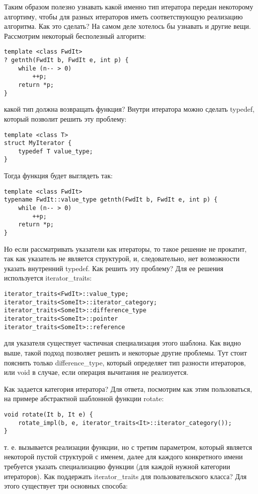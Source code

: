 Таким образом полезно узнавать какой именно тип итератора передан некоторому алгортиму, чтобы для разных итераторов иметь соответствующую реализацию алгоритма.
Как это сделать? На самом деле хотелось бы узнавать и другие вещи. Рассмотрим некоторый бесполезный алгоритм:
\begin{lstlisting}
template <class FwdIt>
? getnth(FwdIt b, FwdIt e, int p) {
	while (n-- > 0)
		++p;
	return *p;
}
\end{lstlisting}
какой тип должна возвращать функция? Внутри итератора можно сделать typedef, который позволит решить эту проблему:
\begin{lstlisting}
template <class T>
struct MyIterator {
	typedef T value_type;
}
\end{lstlisting}
Тогда функция будет выглядеть так:
\begin{lstlisting}
template <class FwdIt>
typename FwdIt::value_type getnth(FwdIt b, FwdIt e, int p) {
	while (n-- > 0)
		++p;
	return *p;
}
\end{lstlisting}
Но если рассматривать указатели как итераторы, то такое решение не прокатит, так как указатель не является структурой, и, следовательно, нет возможности указать
внутренний typedef. Как решить эту проблему? Для ее решения используется iterator\_traits:
\begin{lstlisting}
iterator_traits<FwdIt>::value_type;
iterator_traits<SomeIt>::iterator_category;
iterator_traits<SomeIt>::difference_type
iterator_traits<SomeIt>::pointer
iterator_traits<SomeIt>::reference
\end{lstlisting}
для указателя существует частичная специализация этого шаблона. Как видно выше, такой подход позволяет решить и некоторые другие проблемы. Тут стоит пояснить
только difference\_type, который определяет тип разности итераторов, или void в случае, если операция вычитания не реализуется.

Как задается категория итератора? Для ответа, посмотрим как этим пользоваться, на примере абстрактной шаблонной функции rotate:
\begin{lstlisting}
void rotate(It b, It e) {
	rotate_impl(b, e, iterator_traits<It>::iterator_category());
}
\end{lstlisting}
т. е. вызывается реализации функции, но с третим параметром, который является некоторой пустой структурой с именем, далее для каждого конкретного имени
требуется указать специализацию функции (для каждой нужной категории итераторов). Как поддержать iterator\_traits для пользовательского класса? Для этого
существует три основных способа:

